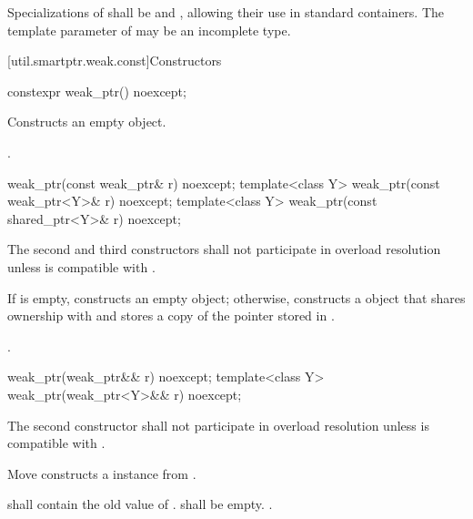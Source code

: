 \pnum
Specializations of  shall be  and
, allowing their use in standard
containers.  The template parameter  of  may be an
incomplete type.

[util.smartptr.weak.const]{Constructors}

%
\begin{itemdecl}
constexpr weak_ptr() noexcept;
\end{itemdecl}

\begin{itemdescr}
\pnum
\effects
Constructs an empty  object.

\pnum
\ensures
{}.
\end{itemdescr}

%
\begin{itemdecl}
weak_ptr(const weak_ptr& r) noexcept;
template<class Y> weak_ptr(const weak_ptr<Y>& r) noexcept;
template<class Y> weak_ptr(const shared_ptr<Y>& r) noexcept;
\end{itemdecl}

\begin{itemdescr}
\pnum
\remarks
The second and third constructors shall not participate in
overload resolution unless  is compatible with .

\pnum
\effects
If  is empty, constructs
an empty  object; otherwise, constructs
a  object that shares ownership
with  and stores a copy of the pointer stored in .

\pnum
\ensures
{}.
\end{itemdescr}

%
\begin{itemdecl}
weak_ptr(weak_ptr&& r) noexcept;
template<class Y> weak_ptr(weak_ptr<Y>&& r) noexcept;
\end{itemdecl}

\begin{itemdescr}
\pnum
\remarks
The second constructor shall not participate in overload resolution unless
 is compatible with .

\pnum
\effects
Move constructs a  instance from .

\pnum
\ensures
{} shall contain the old value of .
 shall be empty. .
\end{itemdescr}

